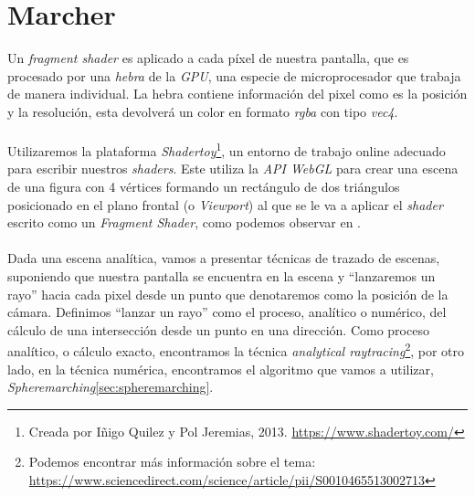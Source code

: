 \chapter{Marcher\label{ch:marcher}}
Un \textit{fragment shader} es aplicado a cada píxel de nuestra pantalla, que es procesado por una \textit{hebra} de la \textit{GPU}, una especie de microprocesador que trabaja de manera individual. La hebra contiene información del pixel como es la posición y la resolución, esta devolverá un color en formato \textit{rgba} con tipo \textit{vec4}.\\\\
Utilizaremos la plataforma \textit{Shadertoy}\footnote{Creada por Iñigo Quilez  y Pol Jeremias, 2013. \url{https://www.shadertoy.com/}}, un entorno de trabajo online adecuado para escribir nuestros \textit{shaders}. Este utiliza la \textit{API WebGL} para crear una escena de una figura con 4 vértices formando un rectángulo de dos triángulos posicionado en el plano frontal (o \textit{Viewport}) al que se le va a aplicar el \textit{shader} escrito como un \textit{Fragment Shader}, como podemos observar en . \\\\
Dada una escena analítica, vamos a presentar técnicas de trazado de escenas, suponiendo que nuestra pantalla se encuentra en la escena y \enquote{lanzaremos un rayo} hacia cada pixel desde un punto que denotaremos como la posición de la cámara. Definimos \enquote{lanzar un rayo} como el proceso, analítico o numérico, del cálculo de una intersección desde un punto en una dirección. Como proceso analítico, o cálculo exacto, encontramos la técnica 
\textit{analytical raytracing}\footnote{Podemos encontrar más información sobre el tema: \url{https://www.sciencedirect.com/science/article/pii/S0010465513002713}}, por otro lado, en la técnica numérica, encontramos el algoritmo que vamos a utilizar, \textit{Spheremarching}\ref{sec:spheremarching}.

